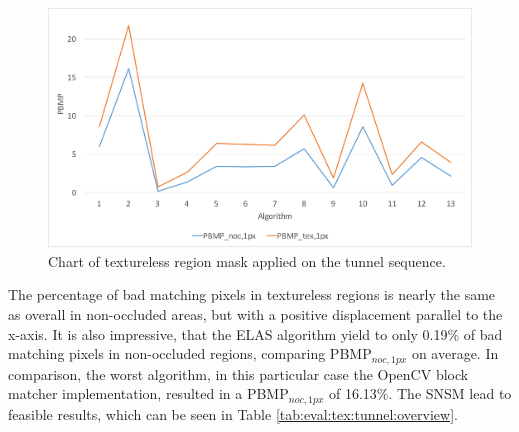 \begin{figure}[h!]
\centering
\includegraphics[width=1.0\textwidth]{src/images/evaluation/plots/05-tunnel-pbmp-tex-1.pdf}
\caption[Chart of textureless region mask]{Chart of textureless region mask applied on the tunnel sequence.}
\label{fig:eval-plots-pbmp-tex1}
\end{figure}

\noindent The percentage of bad matching pixels in textureless regions is nearly the same as overall in non-occluded areas, but with a positive displacement parallel to the x-axis.
It is also impressive, that the ELAS algorithm yield to only 0.19\% of bad matching pixels in non-occluded regions, comparing PBMP$_{noc,1px}$ on average.
In comparison, the worst algorithm, in this particular case the OpenCV block matcher implementation, resulted in a PBMP$_{noc,1px}$ of 16.13\%.
The SNSM lead to feasible results, which can be seen in Table \ref{tab:eval:tex:tunnel:overview}.

\begin{table}[h!]
\centering
{}
\caption[Result table for tunnel scene]{Result table for tunnel scene of Cambridge dataset}
\label{tab:eval:tex:tunnel:overview}
\end{table}

